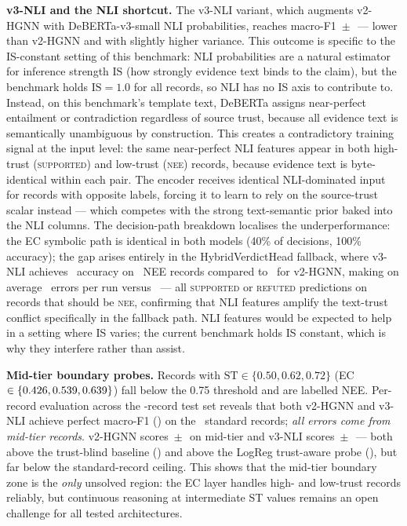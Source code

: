 \documentclass[11pt]{article}
\begin{document}
\textbf{v3-NLI and the NLI shortcut.} The v3-NLI variant, which augments v2-HGNN with DeBERTa-v3-small NLI probabilities, reaches macro-F1 \VthreeMF\,$\pm$\,\VthreeStd\ --- lower than v2-HGNN and with slightly higher variance. This outcome is specific to the IS-constant setting of this benchmark: NLI probabilities are a natural estimator for inference strength $\mathrm{IS}$ (how strongly evidence text binds to the claim), but the benchmark holds $\mathrm{IS}=1.0$ for all records, so NLI has no IS axis to contribute to. Instead, on this benchmark's template text, DeBERTa assigns near-perfect entailment or contradiction regardless of source trust, because all evidence text is semantically unambiguous by construction. This creates a contradictory training signal at the input level: the same near-perfect NLI features appear in both high-trust (\textsc{supported}) and low-trust (\textsc{nee}) records, because evidence text is byte-identical within each pair. The encoder receives identical NLI-dominated input for records with opposite labels, forcing it to learn to rely on the source-trust scalar instead --- which competes with the strong text-semantic prior baked into the NLI columns. The decision-path breakdown localises the underperformance: the EC symbolic path is identical in both models (40\% of decisions, 100\% accuracy); the gap arises entirely in the HybridVerdictHead fallback, where v3-NLI achieves \VthreeVHAcc\ accuracy on \VHTotal\ NEE records compared to \VtwoVHAcc\ for v2-HGNN, making on average \VthreeVHErr\ errors per run versus \VtwoVHErr\ --- all \textsc{supported} or \textsc{refuted} predictions on records that should be \textsc{nee}, confirming that NLI features amplify the text-trust conflict specifically in the fallback path. NLI features would be expected to help in a setting where IS varies; the current benchmark holds IS constant, which is why they interfere rather than assist.

\textbf{Mid-tier boundary probes.} Records with $\mathrm{ST}\in\{0.50,0.62,0.72\}$ (EC $\in\{0.426,0.539,0.639\}$) fall below the 0.75 threshold and are labelled NEE. Per-record evaluation across the \NTest-record test set reveals that both v2-HGNN and v3-NLI achieve perfect macro-F1 (\VtwoStdMF) on the \NStandard\ standard records; \emph{all errors come from mid-tier records}. v2-HGNN scores \VtwoMidMF\,$\pm$\,\VtwoMidStd\ on mid-tier and v3-NLI scores \VthreeMidMF\,$\pm$\,\VthreeMidStd\ --- both above the trust-blind baseline (\MidTierBlindMF) and above the LogReg trust-aware probe (\MidTierMF), but far below the standard-record ceiling. This shows that the mid-tier boundary zone is the \emph{only} unsolved region: the EC layer handles high- and low-trust records reliably, but continuous reasoning at intermediate ST values remains an open challenge for all tested architectures.
\end{document}
